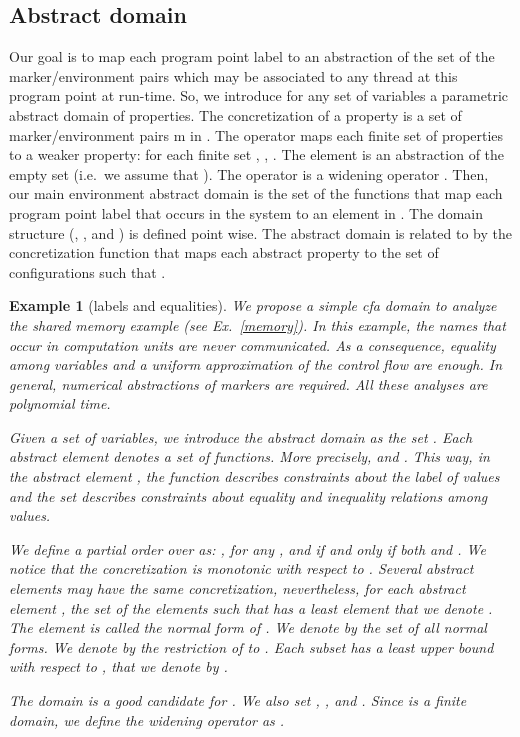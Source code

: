 \documentclass{article}
\newcommand{\boxexample}{}
\newtheorem{example}[thm]{Example}
\newcommand{\cfadomain}{labels and equalities}
\newcommand{\icfadomain}{\cfadomain}
\begin{document}
\subsection{Abstract domain}
Our goal is to map each program point label to an abstraction of the set of the marker/environment pairs which may be associated to any thread at this program point at run-time. 
So, we introduce for any set of variables   a parametric abstract domain    of properties.
The concretization  of a property  is 
a set of marker/environment pairs m in .
The operator  maps each finite set of properties to a weaker
property: for each finite set , , . 
The element  is an abstraction of the empty set 
(i.e.~we assume that ).
The operator  is a widening operator \cite{cc:galois-widening}.
Then, our main environment abstract domain 
is the set of the functions that map each program point label  that occurs in the system  to an element in . 
The domain structure (, , and )  is defined point wise. 
The abstract domain   is related to  by
the concretization function  that maps each abstract property
 to the set of  configurations
 such that .

\begin{example}[\icfadomain]
\label{cfadomain}
We propose a simple \emph{cfa} domain to analyze the shared memory example (see Ex.~\ref{memory}).  In this example, the names that occur in computation units are never communicated. As a consequence, equality  among variables \cite[Sect.~5.1.1]{feret:esop2002}  and a uniform approximation of the control flow \cite{nielson:journal,nielson:concur98} are enough. In general, numerical abstractions of markers \cite{feret:sas2000,feret:esop2002}  are required. All these analyses \cite{nielson:journal,nielson:concur98,feret:esop2002,feret:sas2000} are polynomial time.

Given a set  of variables, we introduce the abstract domain 
 as the set . Each abstract element  denotes a set  of functions. More precisely,  and . This way, in the abstract element , the function  describes constraints about the label of values and the set  describes constraints about equality and inequality relations among values.

We define a partial order  over  as: , for any , and  if and only if both  and . 
We notice that the concretization  is monotonic with respect to . Several abstract elements may have the same concretization, nevertheless, for each abstract element , the set of the elements  such that  has a least element that we denote . The element  is called the normal form of . We denote by  the set  of all normal forms. We denote by  the restriction of  to . Each subset  has a least upper bound with respect to , that we denote by . 

The domain  is a good candidate for . 
We also set , 
, and . Since  is a finite domain, we define the widening operator  as .
\boxexample\end{example}
\end{document}

